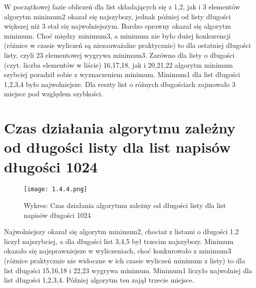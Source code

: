 \documentclass{mwart}
\begin{document}
	\medskip

	\begin{pysub}
	
		W początkowej fazie obliczeń dla list składających się z 1,2, jak i 3 elementów algorytm minimum2 okazał się najszybszy, jednak później od listy długości większej niż 3 stał się najwolniejszym. Bardzo sprawny okazał się algorytm minimum. Choć między minimum3, a minimum nie było dużej konkurencji (różnice w czasie wyliczeń są niezauważalne praktycznie) to dla ostatniej długości listy, czyli 23 elementowej wygrywa minimum3. Zarówno dla listy o długości (czyt. liczba elementów w liście) 16,17,18, jak i 20,21,22 algorytm minimum szybciej poradził sobie z wyznaczeniem minimum. Minimum1 dla list długości 1,2,3,4 było najwolniejsze. Dla reszty list o różnych długościach zajmowało 3 miejsce pod względem szybkości.
	
	\end{pysub}
	
	
	
	\section{\textbf{Czas działania algorytmu zależny od długości listy dla list napisów długości 1024}}\label{Czas działania algorytmu zależny od długości listy dla list napisów długości 1024}

	\medskip
	
	\begin{figure}[H]
		\begin{center}
			\texttt{[image: 1.4.4.png]}
			\caption{Wykres: Czas działania algorytmu zależny od długości listy dla list napisów długości 1024}
		\end{center}
	\end{figure}
	
	\medskip
	\medskip 
	\medskip
	
	\begin{pysub}
	
		Najwolniejszy okazał się algorytm minimum2, chociaż z listami o długości 1,2 liczył najszybciej, a dla długości list 3,4,5 był trzecim najszybszy. Minimum okazało się najsprawniejsze w wyliczeniach, choć konkurowało z minimum3 (różnice praktycznie nie widoczne w ich czasie wyliczeń minimum z listy) to dla list długości 15,16,18 i 22,23 wygrywa minimum. Minimum1 liczyło najwolniej dla list długości 1,2,3,4. Później algorytm ten zajął trzecie miejsce.
		
	\end{pysub}
	
\end{document}
